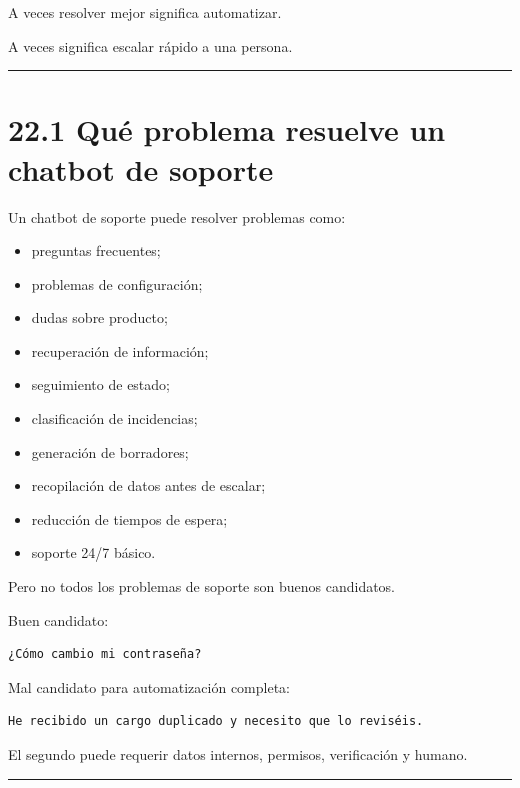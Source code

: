 A veces resolver mejor significa automatizar.

A veces significa escalar rápido a una persona.

\begin{center}\rule{0.5\linewidth}{0.5pt}\end{center}

\section{22.1 Qué problema resuelve un chatbot de
soporte}\label{quuxe9-problema-resuelve-un-chatbot-de-soporte}

Un chatbot de soporte puede resolver problemas como:

\begin{itemize}
\tightlist
\item
  preguntas frecuentes;
\item
  problemas de configuración;
\item
  dudas sobre producto;
\item
  recuperación de información;
\item
  seguimiento de estado;
\item
  clasificación de incidencias;
\item
  generación de borradores;
\item
  recopilación de datos antes de escalar;
\item
  reducción de tiempos de espera;
\item
  soporte 24/7 básico.
\end{itemize}

Pero no todos los problemas de soporte son buenos candidatos.

Buen candidato:

\begin{lstlisting}
¿Cómo cambio mi contraseña?
\end{lstlisting}

Mal candidato para automatización completa:

\begin{lstlisting}
He recibido un cargo duplicado y necesito que lo reviséis.
\end{lstlisting}

El segundo puede requerir datos internos, permisos, verificación y
humano.

\begin{center}\rule{0.5\linewidth}{0.5pt}\end{center}


